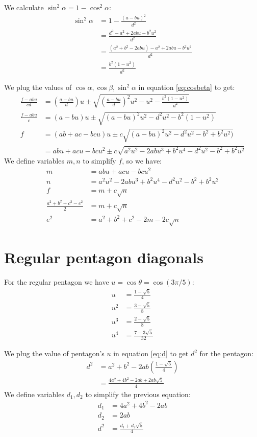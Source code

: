 \documentclass[11pt]{article}
\begin{document}
We calculate $\sin^2\alpha = 1 - \cos^2\alpha$:
\begin{align}
\sin^2\alpha &= 1 - \frac{(a - bu)^2}{d^2}\nonumber\\
 &=\frac{d^2 - a^2 + 2abu - b^2u^2}{d^2}\nonumber\\
 &=\frac{(a^2 + b^2 - 2abu) - a^2 + 2abu - b^2u^2}{d^2}\nonumber\\
 &=\frac{b^2(1-u^2)}{d^2}
\end{align}

We plug the values of $\cos\alpha, \cos\beta, \sin^2\alpha$ in equation \ref{eq:cosbeta} to get:
\begin{align}
\frac{f - abu}{cd} &= \left(\frac{a - bu}{d}\right)u \pm \sqrt{
 \left(\frac{a - bu}{d}\right)^2u^2 - u^2 - \frac{b^2(1-u^2)}{d^2}
}\nonumber\\
\frac{f - abu}{c} &= (a - bu)u \pm \sqrt{(a-bu)^2u^2 - d^2u^2 - b^2(1-u^2)}\nonumber\\
f &= (ab + ac - bcu)u \pm c\sqrt{(a-bu)^2u^2 - d^2u^2 - b^2 +b^2u^2)}\nonumber\\
 &= abu + acu - bcu^2 \pm c\sqrt{a^2u^2 - 2abu^3 + b^2u^4- d^2u^2 - b^2 +b^2u^2 }
\end{align}
We define variables $m,n$ to simplify $f$, so we have:
\begin{align}
m &= abu + acu - bcu^2 \label{eq:m}\\
n &= a^2u^2 - 2abu^3 + b^2u^4- d^2u^2 - b^2 +b^2u^2 \label{eq:n}\\
f &= m + c\sqrt{n} \label{eq:f}\\
\frac{a^2 + b^2 + c^2 - e^2}{2} &= m + c\sqrt{n}\\
e^2 &= a^2 + b^2 + c^2 - 2m - 2c\sqrt{n}
\end{align}

\section{Regular pentagon diagonals}

For the regular pentagon we have $u = \cos\theta = \cos(3\pi/5)$:
\begin{align}
u &= \frac{1-\sqrt{5}}{4}\\
u^2 &= \frac{3-\sqrt{5}}{8}\\
u^3 &= \frac{2-\sqrt{5}}{8}\\
u^4 &= \frac{7-3\sqrt{5}}{32}
\end{align}

We plug the value of pentagon's $u$ in equation \ref{eq:d} to get $d^2$ for the pentagon:
\begin{align}
d^2 &= a^2 + b^2 - 2ab\left(\frac{1-\sqrt{5}}{4}\right)\nonumber\\
 &= \frac{4a^2 + 4b^2 - 2ab + 2ab\sqrt{5}}{4}
\end{align}
We define variables $d_1,d_2$ to simplify the previous equation:
\begin{align}
d_1 &= 4a^2 + 4b^2 - 2ab\\
d_2 &= 2ab\\
d^2 &= \frac{d_1 + d_2\sqrt5}4 \label{eq:d-penta}
\end{align}
\end{document}
